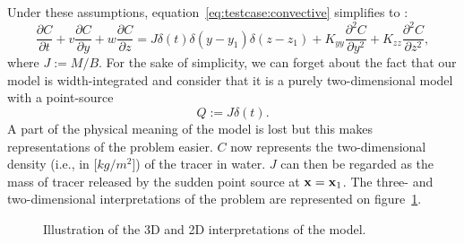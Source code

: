Under these assumptions, equation~\eqref{eq:testcase:convective} simplifies to :
\begin{equation} \label{eq:testcase}
	\frac{\partial C}{\partial t} + v \frac{\partial C}{\partial y} + w \frac{\partial C}{\partial z} = J \delta(t) \delta(y - y_1)\delta(z-z_1) + K_{yy} \frac{\partial^2 C}{\partial y^2} + K_{zz} \frac{\partial^2 C}{\partial z^2},
\end{equation}
where $J := M/B$.
For the sake of simplicity, we can forget about the fact that our model is width-integrated and consider that it is a purely two-dimensional model with a point-source
\begin{equation}
	Q := J\delta(t).
\end{equation}
A part of the physical meaning of the model is lost but this makes representations of the problem easier. $C$ now represents the two-dimensional density (i.e., in [$kg/m^2$]) of the tracer in water. $J$ can then be regarded as the mass of tracer released by the sudden point source at $\mathbf x = \mathbf x_1$. The three- and two-dimensional interpretations of the problem are represented on figure~\ref{fig:testcase_scheme}.
\begin{figure}[H]
	\centering
	\scalebox{.8}{}
	\scalebox{.8}{}
	\caption{Illustration of the 3D and 2D interpretations of the model.}
    \label{fig:testcase_scheme}
\end{figure}


